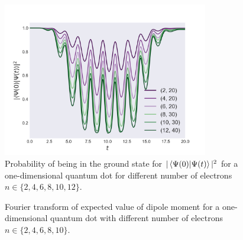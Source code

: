 \begin{figure}
    \centering
    \includegraphics[width=0.8\textwidth]{results/figures/1D/n_compare_overlap.png} 
    \caption{Probability of being in the ground state for $|\braket*{\Psi(0)}{\Psi(t)}|^2$
        for a one-dimensional quantum dot for different number of electrons 
        $n\in\{2,4,6,8,10,12\}$.
    }
    \label{}
\end{figure}

\begin{figure}
    \centering
    \caption{Fourier transform of expected value of dipole moment for 
        a one-dimensional quantum dot with different number of electrons
        $n\in\{2,4,6,8,10\}$.
    }
    \label{}
\end{figure}

